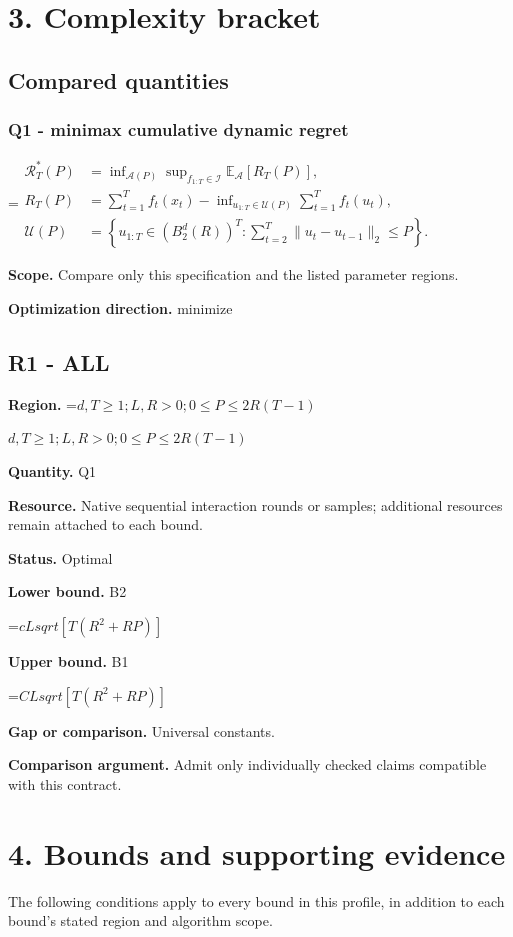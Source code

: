 \documentclass[10pt,a4paper]{article}
\newcommand{\AtlasMath}[1]{\par\begingroup\centering\setbox0=\hbox{$\displaystyle #1$}\ifdim\wd0>1.4\linewidth\typeout{ATLAS WIDE FORMULA: \the\wd0}\fi\ifdim\wd0>\linewidth\resizebox{\linewidth}{!}{\box0}\else\box0\fi\par\endgroup}
\newcommand{\AtlasInlineMath}[1]{\begingroup\setbox0=\hbox{$#1$}\ifdim\wd0>.4\linewidth\endgroup\AtlasMath{#1}\else\endgroup$#1$\fi}
\begin{document}
\section{3. Complexity bracket}
\subsection{Compared quantities}
\subsubsection{Q1 - minimax cumulative dynamic regret}
\AtlasMath{\begin{aligned}\mathcal R_T^*(P)&=\inf_{\mathcal A(P)}\sup_{f_{1:T}\in\mathcal I}\mathbb E_{\mathcal A}[R_T(P)],\\ R_T(P)&=\sum_{t=1}^T f_t(x_t)-\inf_{u_{1:T}\in\mathcal U(P)}\sum_{t=1}^T f_t(u_t),\\ \mathcal U(P)&=\left\{u_{1:T}\in(B_2^d(R))^T:\sum_{t=2}^T\|u_t-u_{t-1}\|_2\le P\right\}.\end{aligned}}
\textbf{Scope.} Compare only this specification and the listed parameter regions.

\textbf{Optimization direction.} minimize

\subsection{R1 - ALL}
\textbf{Region.} \AtlasInlineMath{d,T\ge 1; L,R>0; 0\le P\le 2R(T-1)}

\textbf{Quantity.} Q1

\textbf{Resource.} Native sequential interaction rounds or samples; additional resources remain attached to each bound.

\textbf{Status.} Optimal

\textbf{Lower bound.} B2

\AtlasMath{c Lsqrt[T(R^2+RP)]}
\textbf{Upper bound.} B1

\AtlasMath{C Lsqrt[T(R^2+RP)]}
\textbf{Gap or comparison.} Universal constants.

\textbf{Comparison argument.} Admit only individually checked claims compatible with this contract.

\section{4. Bounds and supporting evidence}
The following conditions apply to every bound in this profile, in addition to each bound's stated region and algorithm scope.
\end{document}

